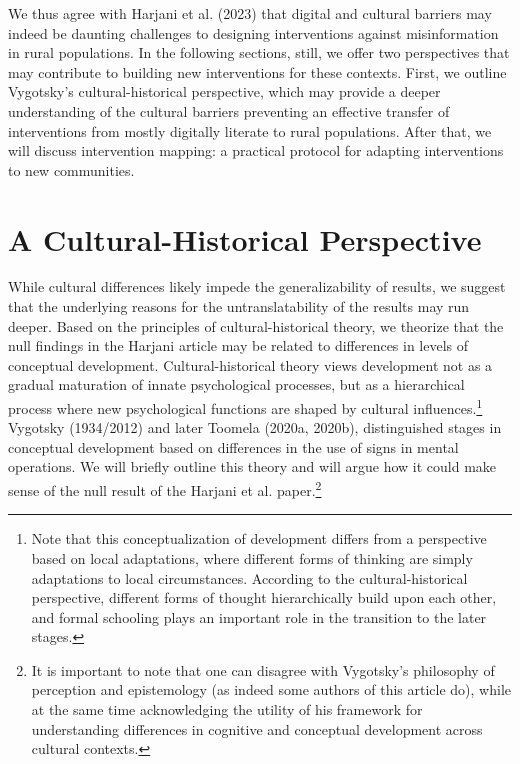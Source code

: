 \documentclass[authordate, reflection]{jote-new-article}
\begin{document}
	We thus agree with Harjani et al. (2023) that digital and cultural barriers may indeed be daunting challenges to designing interventions against misinformation in rural populations. In the following sections, still, we offer two perspectives that may contribute to building new interventions for these contexts. First, we outline Vygotsky's cultural-historical perspective, which may provide a deeper understanding of the cultural barriers preventing an effective transfer of interventions from mostly digitally literate to rural populations. After that, we will discuss intervention mapping: a practical protocol for adapting interventions to new communities.



	\section{A Cultural-Historical Perspective}



	While cultural differences likely impede the generalizability of results, we suggest that the underlying reasons for the untranslatability of the results may run deeper. Based on the principles of cultural-historical theory, we theorize that the null findings in the Harjani article may be related to differences in levels of conceptual development. Cultural-historical theory views development not as a gradual maturation of innate psychological processes, but as a hierarchical process where new psychological functions are shaped by cultural influences.\footnote{Note that this conceptualization of development differs from a perspective based on local adaptations, where different forms of thinking are simply adaptations to local circumstances. According to the cultural-historical perspective, different forms of thought hierarchically build upon each other, and formal schooling plays an important role in the transition to the later stages.} Vygotsky (1934/2012) and later Toomela (2020a, 2020b), distinguished stages in conceptual development based on differences in the use of signs in mental operations. We will briefly outline this theory and will argue how it could make sense of the null result of the Harjani et al. paper.\footnote{It is important to note that one can disagree with Vygotsky's philosophy of perception and epistemology (as indeed some authors of this article do), while at the same time acknowledging the utility of his framework for understanding differences in cognitive and conceptual development across cultural contexts.}
\end{document}
